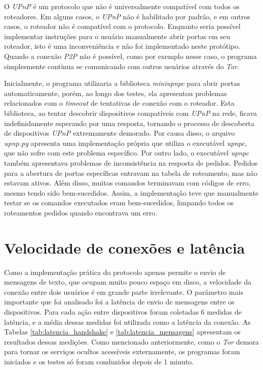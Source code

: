 O \textit{UPnP} é um protocolo que não é universalmente compatível com todos os roteadores. Em alguns casos, o \textit{UPnP} não é habilitado por padrão, e em outros casos, o roteador não é compatível com o protocolo. Enquanto seria possível implementar instruções para o usuário manualmente abrir portas em seu roteador, isto é uma inconveniência e não foi implementado neste protótipo. Quando a conexão \textit{P2P} não é possível, como por exemplo nesse caso, o programa simplesmente continua se comunicando com outros usuários através do \textit{Tor}.

Inicialmente, o programa utilizaria a biblioteca \textit{miniupnpc} para abrir portas automaticamente, porém, ao longo dos testes, ela apresentou problemas relacionados com o \textit{timeout} de tentativas de conexão com o roteador. Esta biblioteca, ao tentar descobrir dispositivos compatíveis com \textit{UPnP} na rede, ficava indefinidamente esperando por uma resposta, tornando o processo de descoberta de dispositivos \textit{UPnP} extremamente demorado. Por causa disso, o arquivo \textit{upnp.py} apresenta uma implementação própria que utiliza o executável \textit{upnpc}, que não sofre com este problema específico. Por outro lado, o executável \textit{upnpc} também apresentava problemas de inconsistência na resposta de pedidos. Pedidos para a abertura de portas específicas entravam na tabela de roteamento, mas não estavam ativos. Além disso, muitos comandos terminavam com códigos de erro, mesmo tendo sido bem-sucedidos. Assim, a implementação teve que manualmente testar se os comandos executados eram bem-sucedidos, limpando todos os roteamentos pedidos quando encontrava um erro.

\section{Velocidade de conexões e latência}

Como a implementação prática do protocolo apenas permite o envio de mensagens de texto, que ocupam muito pouco espaço em disco, a velocidade da conexão entre dois usuários é em grande parte irrelevante. O parâmetro mais importante que foi analisado foi a latência de envio de mensagens entre os dispositivos. Para cada ação entre dispositivos foram coletadas 6 medidas de latência, e a média dessas medidas foi utilizada como a latência da conexão. As Tabelas \ref{tab:latencia_handshake} e \ref{tab:latencia_mensagens} apresentam os resultados dessas medições. Como mencionado anteriormente, como o \textit{Tor} demora para tornar os serviços ocultos acessíveis externamente, os programas foram iniciados e os testes só foram conduzidos depois de 1 minuto.

